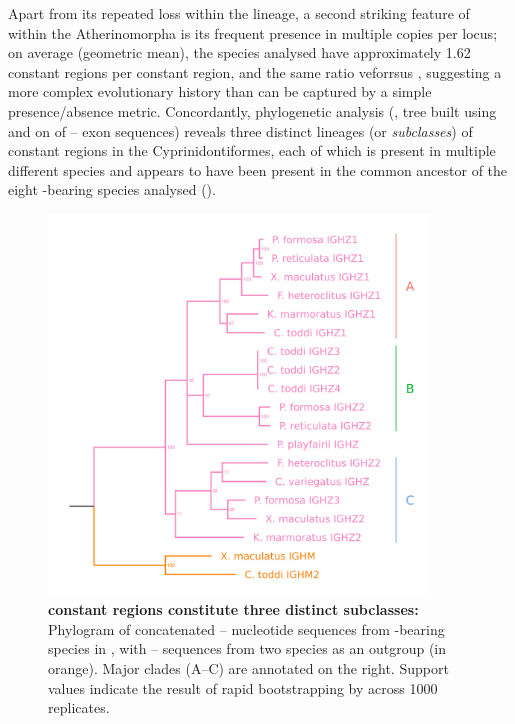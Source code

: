 Apart from its repeated loss within the lineage, a second striking feature of  within the Atherinomorpha is its frequent presence in multiple copies per \igh{} locus; on average (geometric mean), the species analysed have approximately 1.62  constant regions per  constant region, and the same ratio veforrsus , suggesting a more complex evolutionary history than can be captured by a simple presence/absence metric. Concordantly, phylogenetic analysis (, tree built using  and  on of -- exon sequences) reveals three distinct lineages (or \textit{subclasses}) of  constant regions in the Cyprinidontiformes, each of which is present in multiple different species and appears to have been present in the common ancestor of the eight -bearing species analysed ().

\begin{figure}
	\centering
	\includegraphics[width=0.9\textwidth]{_Figures/png/multispecies-cz-tree}
	\caption[ constant regions constitute three distinct subclasses]{\textbf{ constant regions constitute three distinct subclasses:} 
	Phylogram of concatenated -- nucleotide sequences from -bearing species in , with -- sequences from two species as an outgroup (in orange). Major clades (A--C) are annotated on the right. Support values indicate the result of rapid bootstrapping by  across 1000 replicates.}
	\label{fig:multispecies-cz-tree}
\end{figure}

